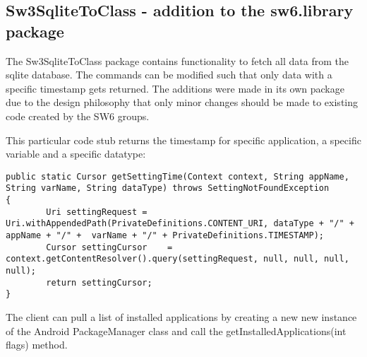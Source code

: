 \subsection{Sw3SqliteToClass - addition to the sw6.library package}
The Sw3SqliteToClass package contains functionality to fetch all data from the sqlite database. The commands can be modified such that only data with a specific timestamp gets returned. The additions were made in its own package due to the design philosophy that only minor changes should be made to existing code created by the SW6 groups.

This particular code stub returns the timestamp for specific application, a specific variable and a specific datatype:

\lstset{language=JAVA}
\begin{lstlisting}
public static Cursor getSettingTime(Context context, String appName, String varName, String dataType) throws SettingNotFoundException 
{
		Uri settingRequest = Uri.withAppendedPath(PrivateDefinitions.CONTENT_URI, dataType + "/" + appName + "/" +  varName + "/" + PrivateDefinitions.TIMESTAMP);
		Cursor settingCursor 	= context.getContentResolver().query(settingRequest, null, null, null, null);	
		return settingCursor;
}
\end{lstlisting}

The client can pull a list of installed applications by creating a new new instance of the Android PackageManager class and call the getInstalledApplications(int flags) method\cite{AndDevel2}. 


